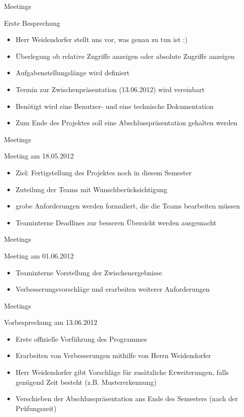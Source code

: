 \begin{frame}{Meetings}
\begin{block}{Erste Besprechung}
\begin{itemize}[<+->]
\pause\item Herr Weidendorfer stellt uns vor, was genau zu tun ist :)
\item Überlegung ob relative Zugriffe anzeigen oder absolute Zugriffe anzeigen
\item Aufgabenstellungslänge wird definiert
\item Termin zur Zwischenpräsentation (13.06.2012) wird vereinbart
\item Benötigt wird eine Benutzer- und eine technische Dokumentation
\item Zum Ende des Projektes soll eine Abschlusspräsentation gehalten werden
\end{itemize}
\end{block}
\end{frame}

\begin{frame}{Meetings}
\begin{block}{Meeting am 18.05.2012}
\begin{itemize}[<+->]
\pause\item Ziel: Fertigstellung des Projektes noch in diesem Semester
\item Zuteilung der Teams mit Wunschberücksichtigung
\item grobe Anforderungen werden formuliert, die die Teams bearbeiten müssen
\item Teaminterne Deadlines zur besseren Übersicht werden ausgemacht
\end{itemize}
\end{block}
\end{frame}

\begin{frame}{Meetings}
\begin{block}{Meeting am 01.06.2012}
\begin{itemize}[<+->]
\pause\item Teaminterne Vorstellung der Zwischenergebnisse
\item Verbesserungsvorschläge und erarbeiten weiterer Anforderungen
\end{itemize}
\end{block}
\end{frame}

\begin{frame}{Meetings}
\begin{block}{Vorbesprechung am 13.06.2012}
\begin{itemize}[<+->]
\pause\item Erste offizielle Vorführung des Programmes
\item Erarbeiten von Verbesserungen mithilfe von Herrn Weidendorfer
\item Herr Weidendorfer gibt Vorschläge für zusätzliche Erweiterungen, falls genügend Zeit besteht (z.B. Mustererkennung)
\item Verschieben der Abschlusspräsentation ans Ende des Semesters (nach der Prüfungszeit)
\end{itemize}
\end{block}
\end{frame}


